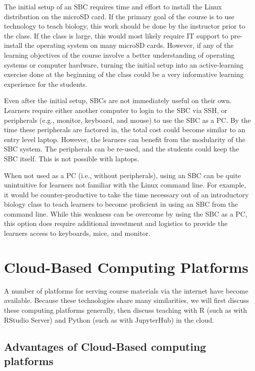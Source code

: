 The initial setup of an SBC requires time and effort to install the
Linux distribution on the microSD card.
If the primary goal of the course is to use technology to teach biology,
this work should be done by the instructor prior to the class.
If the class is large, this would most likely require IT support to pre-install
the operating system on many microSD cards.
However, if any of the learning objectives of the course involve
a better understanding of operating systems or computer hardware,
turning the initial setup into an active-learning exercise done
at the beginning of the class could be a very informative
learning experience for the students.

Even after the initial setup, SBCs are not immediately useful on their own.
Learners require either another computer to login to the SBC via SSH, or
peripherals (e.g., monitor, keyboard, and mouse) to use the SBC as a PC.
By the time these peripherals are factored in, the total cost could become
similar to an entry level laptop.
However, the learners can benefit from the modularity of the SBC system.
The peripherals can be re-used, and the students could keep the SBC itself.
This is not possible with laptops.

When not used as a PC (i.e., without peripherals), using an SBC can be
quite unintuitive for learners not familiar with the Linux command line.
For example, it would be counter-productive to take the time necessary
out of an introductory biology class to teach learners to become proficient
in using an SBC from the command line.
While this weakness can be overcome by using the SBC as a PC, this option does
require additional investment and logistics to provide the learners access to
keyboards, mice, and monitor.


\section{Cloud-Based Computing Platforms}

A number of platforms for serving course materials via the internet have become available. 
Because these technologies share many similarities, we will first discuss these computing platforms generally,
then discuss teaching with R (such as with RStudio Server) and Python (such as with JupyterHub) in the cloud.


\subsection{Advantages of Cloud-Based computing platforms}\label{subsub:cloud-advantage}

